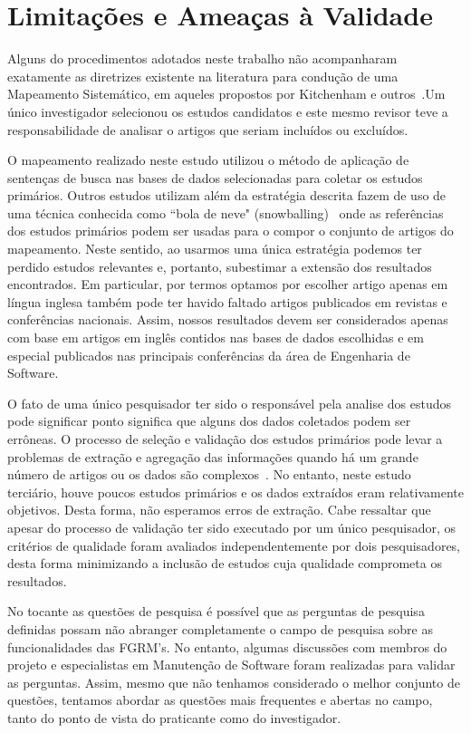 \section{Limitações e Ameaças à Validade} \label{sec:limitacoes_ameacas}

Alguns do procedimentos adotados neste trabalho não acompanharam exatamente as
diretrizes existente na literatura para condução de uma Mapeamento Sistemático,
em aqueles propostos por Kitchenham e outros~\cite{keele2007guidelines}.Um único
investigador selecionou os estudos candidatos e este mesmo revisor teve a
responsabilidade de analisar o artigos que seriam incluídos ou excluídos.

O mapeamento realizado neste estudo utilizou o método de aplicação de sentenças
de busca nas bases de dados selecionadas para coletar os estudos primários.
Outros estudos utilizam além da estratégia descrita fazem de uso de uma técnica
conhecida  como ``bola de neve" (snowballing)~\cite{wohlin2014guidelines} onde
as referências dos estudos primários podem ser usadas para o compor o conjunto
de artigos do mapeamento. Neste sentido, ao usarmos uma única estratégia podemos
ter perdido estudos relevantes e, portanto, subestimar a extensão dos resultados
encontrados. Em particular, por termos optamos por escolher artigo apenas em
língua inglesa também pode ter havido faltado artigos publicados em revistas e
conferências nacionais.  Assim, nossos resultados devem ser considerados apenas
com base em artigos em inglês contidos nas bases de dados escolhidas  e em
especial publicados nas principais conferências da área de Engenharia de
Software.

O fato de uma único pesquisador ter sido o responsável pela analise dos estudos
pode significar ponto significa que alguns dos dados coletados podem ser
errôneas. O processo de seleção e validação dos estudos primários pode levar a
problemas de extração e agregação das informações quando há um grande número de
artigos ou os dados são complexos~\cite{keele2007guidelines}. No entanto, neste
estudo terciário, houve poucos estudos primários e os dados extraídos eram
relativamente objetivos. Desta forma, não esperamos erros de extração. Cabe
ressaltar que apesar do processo de validação ter sido executado por um único
pesquisador, os critérios de qualidade foram avaliados independentemente por
dois pesquisadores, desta forma minimizando a inclusão de estudos cuja qualidade
comprometa os resultados.

No tocante as questões de pesquisa é  possível que as perguntas de pesquisa
definidas possam não abranger completamente o campo de pesquisa sobre as
funcionalidades das FGRM's. No entanto, algumas discussões com membros do
projeto e especialistas em Manutenção de Software foram realizadas para validar
as perguntas. Assim, mesmo que não tenhamos considerado o melhor conjunto de
questões, tentamos abordar as questões mais frequentes e abertas no campo, tanto
do ponto de vista do praticante como do investigador.


